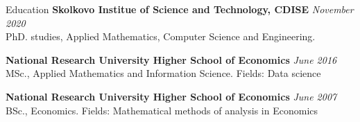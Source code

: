 \documentclass{resume} %
\begin{document}
\begin{rSection}{Education}
\textbf{Skolkovo Institue of Science and Technology, CDISE} \hfill \emph{November 2020} \\
PhD. studies, Applied Mathematics, Computer Science and Engineering.

\medskip
\textbf{National Research University Higher School of Economics} \hfill \emph{June 2016} \\
MSc., Applied Mathematics and Information Science. %
Fields: Data science

\medskip
\textbf{National Research University Higher School of Economics} \hfill \emph{June 2007} \\ 
BSc., Economics. %
Fields: Mathematical methods of analysis in Economics \\
\end{rSection}
\end{document}
